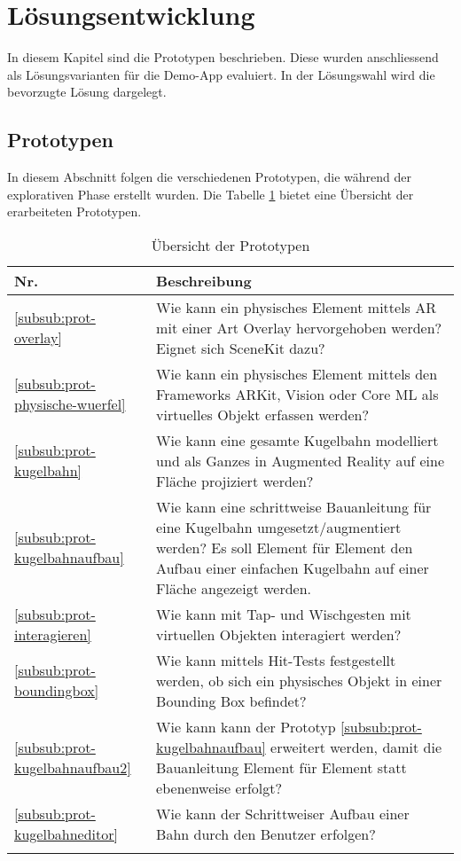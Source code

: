 \section{Lösungsentwicklung}

In diesem Kapitel sind die Prototypen beschrieben. Diese wurden anschliessend als Lösungsvarianten für die Demo-App evaluiert. In der Lösungswahl wird die bevorzugte Lösung dargelegt.

\subsection{Prototypen}

In diesem Abschnitt folgen die verschiedenen Prototypen, die während der explorativen Phase erstellt wurden. Die Tabelle \ref{tab:prototypen} bietet eine Übersicht der erarbeiteten Prototypen.
\begin{longtable}{l p{14cm}}
	\hline
	\textbf{Nr.} & \textbf{Beschreibung} \\
	\hline
  \ref{subsub:prot-overlay} & Wie kann ein physisches Element mittels AR mit einer Art Overlay hervorgehoben werden? Eignet sich SceneKit dazu? \\
  \hline
  \ref{subsub:prot-physische-wuerfel} & Wie kann ein physisches Element mittels den Frameworks ARKit, Vision oder Core ML als virtuelles Objekt erfassen werden? \\
  \hline
  \ref{subsub:prot-kugelbahn} & Wie kann eine gesamte Kugelbahn modelliert und als Ganzes in Augmented Reality auf eine Fläche projiziert werden? \\
  \hline
  \ref{subsub:prot-kugelbahnaufbau} & Wie kann eine schrittweise Bauanleitung für eine Kugelbahn umgesetzt/augmentiert werden? Es soll Element für Element den Aufbau einer einfachen Kugelbahn auf einer Fläche angezeigt werden.  \\
  \hline
  \ref{subsub:prot-interagieren} & Wie kann mit Tap- und Wischgesten mit virtuellen Objekten interagiert werden? \\
  \hline
  \ref{subsub:prot-boundingbox} & Wie kann mittels Hit-Tests festgestellt werden, ob sich ein physisches Objekt in einer Bounding Box befindet? \\
  \hline
  \ref{subsub:prot-kugelbahnaufbau2} & Wie kann kann der Prototyp \ref{subsub:prot-kugelbahnaufbau} erweitert werden, damit die Bauanleitung Element für Element statt ebenenweise erfolgt? \\
  \hline
  \ref{subsub:prot-kugelbahneditor} & Wie kann der Schrittweiser Aufbau einer Bahn durch den Benutzer erfolgen? \\
  \hline
  \caption{Übersicht der Prototypen}
  \label{tab:prototypen}
\end{longtable}

